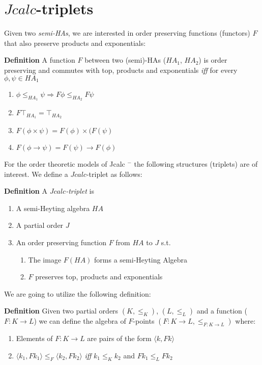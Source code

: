 \section{$Jcalc$-triplets}
Given two \emph{semi-HAs}, we are 
interested in order preserving 
functions (functors) $F$ that also preserve products and exponentials: 
\begin{mdframed}
    \textbf{Definition}
A function $F$ between two (semi)-HAs ($HA_1$, $HA_2$) is order preserving
and commutes with top, products and exponentials \emph{iff} for every 
$\phi,\psi \in HA_1$
    \begin{enumerate}
    \item $\phi\le_{HA_1}\psi\Rightarrow F\phi\le_{HA_2}F\psi$
    \item $F\top_{HA_1} = \top_{HA_2}$ 
    \item{$F(\phi \times\psi) = F(\phi)\times(F(\psi)$} 
    \item $F(\phi\rightarrow \psi) = F(\psi)\rightarrow F(\phi)$
    \end{enumerate}
\end{mdframed}

For the order theoretic models of  Jcalc $^{-}$ the following structures (triplets) 
are of interest. We define a $Jcalc$-triplet as follows:
\begin{mdframed}
    \textbf{Definition}
A \emph{$Jcalc$-triplet} is 
    
\begin{enumerate}
\item A semi-Heyting algebra $HA$
\item A partial order $J$
\item An order preserving function $F$ from $HA$ to $J$ s.t.
\begin{enumerate}
    \item The image $F(HA)$ forms a semi-Heyting Algebra
    \item $F$ preserves top, products and exponentials
\end{enumerate}
\end{enumerate}
\end{mdframed}
We are going to utilize the following definition: 
\begin{mdframed}
    \textbf{Definition}
    Given two partial orders $(K,\le_{K})$, $(L,\le_{L})$ and a function ($F: K\rightarrow L$) 
    we can define the algebra of $F$-points  $(F:K \rightarrow L,\le_{F:K\rightarrow L})$
    where:
    \begin{enumerate}
        \item Elements of $F:K\rightarrow L$ are  pairs of the form $\langle k,Fk \rangle$
        \item $\langle k_1,Fk_1 \rangle \le_F \langle k_2, Fk_2\rangle$ \textit{iff}  $k_1\le_{K}k_2$ and $Fk_1\le_{L}Fk_2$ 
    \end{enumerate}
\end{mdframed}

